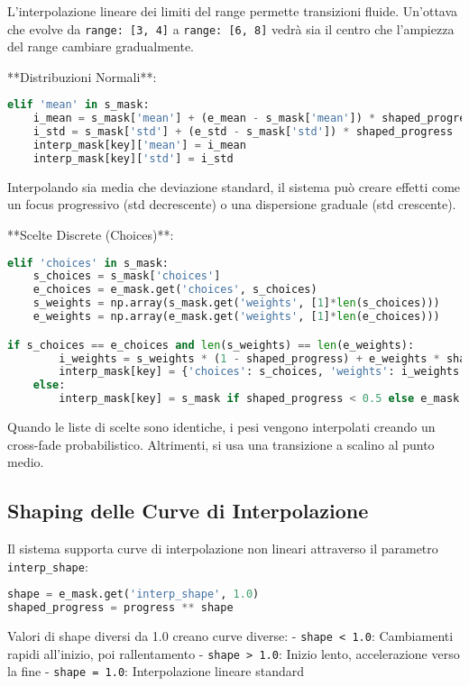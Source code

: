 L'interpolazione lineare dei limiti del range permette transizioni fluide. Un'ottava che evolve da \texttt{range: [3, 4]} a \texttt{range: [6, 8]} vedrà sia il centro che l'ampiezza del range cambiare gradualmente.

**Distribuzioni Normali**:
\begin{lstlisting}[language=Python]
elif 'mean' in s_mask:
    i_mean = s_mask['mean'] + (e_mean - s_mask['mean']) * shaped_progress
    i_std = s_mask['std'] + (e_std - s_mask['std']) * shaped_progress
    interp_mask[key]['mean'] = i_mean
    interp_mask[key]['std'] = i_std
\end{lstlisting}

Interpolando sia media che deviazione standard, il sistema può creare effetti come un focus progressivo (std decrescente) o una dispersione graduale (std crescente).

**Scelte Discrete (Choices)**:
\begin{lstlisting}[language=Python]
elif 'choices' in s_mask:
    s_choices = s_mask['choices']
    e_choices = e_mask.get('choices', s_choices)
    s_weights = np.array(s_mask.get('weights', [1]*len(s_choices)))
    e_weights = np.array(e_mask.get('weights', [1]*len(e_choices)))

if s_choices == e_choices and len(s_weights) == len(e_weights):
        i_weights = s_weights * (1 - shaped_progress) + e_weights * shaped_progress
        interp_mask[key] = {'choices': s_choices, 'weights': i_weights.tolist()}
    else:
        interp_mask[key] = s_mask if shaped_progress < 0.5 else e_mask
\end{lstlisting}

Quando le liste di scelte sono identiche, i pesi vengono interpolati creando un cross-fade probabilistico. Altrimenti, si usa una transizione a scalino al punto medio.
\subsection{Shaping delle Curve di Interpolazione}
Il sistema supporta curve di interpolazione non lineari attraverso il parametro \texttt{interp\_shape}:

\begin{lstlisting}[language=Python]
shape = e_mask.get('interp_shape', 1.0)
shaped_progress = progress ** shape
\end{lstlisting}

Valori di shape diversi da 1.0 creano curve diverse:
- \texttt{shape < 1.0}: Cambiamenti rapidi all'inizio, poi rallentamento
- \texttt{shape > 1.0}: Inizio lento, accelerazione verso la fine
- \texttt{shape = 1.0}: Interpolazione lineare standard

